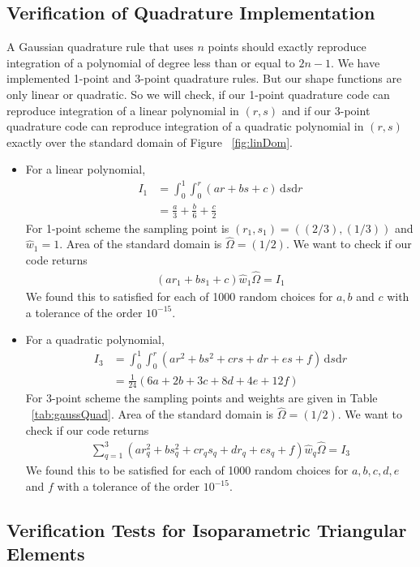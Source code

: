 \documentclass[../main.tex]{subfiles}
\begin{document}
\subsection{Verification of Quadrature Implementation}
A Gaussian quadrature rule that uses $n$ points should exactly
reproduce integration of a polynomial of degree less than or equal to
$2n-1$. We have implemented 1-point and 3-point quadrature rules. But
our shape functions are only linear or quadratic. So we will check, if
our 1-point quadrature code can reproduce integration of a linear
polynomial in $(r,s)$ and if our 3-point quadrature code can reproduce
integration of a quadratic polynomial in $(r,s)$ exactly over the
standard domain of Figure ~\ref{fig:linDom}.
\begin{itemize}
\item For a linear polynomial,
  \begin{align*}
    I_1 &= \int_0^1\int_0^r\!(ar+bs+c)\,\mathrm{d}s\mathrm{d}r \\
        &= \frac{a}{3}+\frac{b}{6}+\frac{c}{2}
  \end{align*}
  For 1-point scheme the sampling point is $(r_1,s_1)=((2/3),(1/3))$
  and $\hat{w}_1 = 1$. Area of the standard domain is
  $\hat{\Omega} = (1/2)$. We want to check if our code returns
  \begin{align*}
    (ar_1+bs_1+c)\hat{w}_1\hat{\Omega} = I_1
  \end{align*}
  We found this to satisfied for each of 1000 random choices for $a,b$
  and $c$ with a tolerance of the order $10^{-15}$.
\item For a quadratic polynomial,
  \begin{align*}
    I_3 &= \int_0^1\int_0^r\!(ar^2+bs^2+crs+dr+es+f)\,\mathrm{d}s\mathrm{d}r \\
        &= \frac{1}{24}(6a+2b+3c+8d+4e+12f)
  \end{align*} 
  For 3-point scheme the sampling points and weights are given in
  Table ~\ref{tab:gaussQuad}. Area of the standard domain is
  $\hat{\Omega} = (1/2)$. We want to check if our code returns
  \begin{align*}
    \sum_{q=1}^3(ar^2_q+bs^2_q+cr_qs_q+dr_q+es_q+f)\hat{w}_q\hat{\Omega} = I_3
  \end{align*}
  We found this to be satisfied for each of 1000 random choices for
  $a,b,c,d,e$ and $f$ with a tolerance of the order $10^{-15}$.
\end{itemize}

\subsection{Verification Tests for Isoparametric Triangular Elements}
\end{document}
